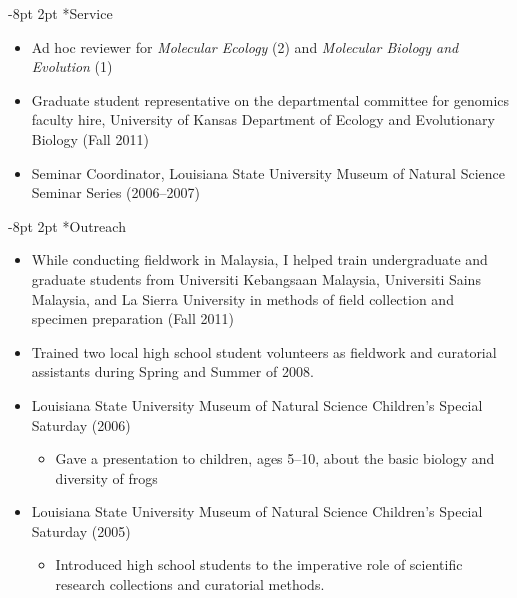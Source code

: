\documentclass[10pt]{article}
\makeatletter
\renewcommand{\section}{\@startsection{section}{1}{0mm}%
    {-8pt}%
    {2pt}%
   {\bfseries\large}}
\newenvironment{myItemize}{
  \begin{itemize}
    \setlength{\leftskip}{-5mm}
    \setlength{\itemsep}{1pt}
    \setlength{\parskip}{0pt}
    \setlength{\parsep}{0pt}}
  {\end{itemize}}
\makeatother
\begin{document}
\section*{Service}
\begin{myItemize}
\item Ad hoc reviewer for \emph{Molecular Ecology} (2) and \emph{Molecular Biology and Evolution} (1)
\item Graduate student representative on the departmental committee for genomics faculty hire, University of Kansas Department of Ecology and Evolutionary Biology (Fall 2011)
\item Seminar Coordinator, Louisiana State University Museum of Natural Science Seminar Series (2006--2007)
\end{myItemize}

\section*{Outreach}
\begin{myItemize}
\item While conducting fieldwork in Malaysia, I helped train undergraduate and graduate students from Universiti Kebangsaan Malaysia, Universiti Sains Malaysia, and La Sierra University in methods of field collection and specimen preparation (Fall 2011)
\item Trained two local high school student volunteers as fieldwork and curatorial assistants during Spring and Summer of 2008.
\item Louisiana State University Museum of Natural Science Children’s Special Saturday (2006)
	\begin{myItemize}
	\item Gave a presentation to children, ages 5--10, about the basic biology and diversity of frogs
	\end{myItemize}
\item Louisiana State University Museum of Natural Science Children’s Special Saturday (2005)
	\begin{myItemize}
	\item Introduced high school students to the imperative role of scientific research collections and curatorial methods.
	\end{myItemize}
\end{myItemize}
\end{document}
